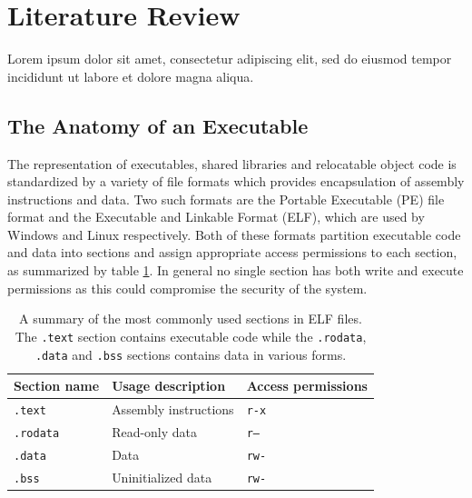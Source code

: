 \documentclass[12pt, a4paper]{article}
\begin{document}
\pagebreak



\section{Literature Review}

Lorem ipsum dolor sit amet, consectetur adipiscing elit, sed do eiusmod tempor incididunt ut labore et dolore magna aliqua.


\subsection{The Anatomy of an Executable}
\label{executable_anatomy}

The representation of executables, shared libraries and relocatable object code is standardized by a variety of file formats which provides encapsulation of assembly instructions and data. Two such formats are the Portable Executable (PE) file format and the Executable and Linkable Format (ELF), which are used by Windows and Linux respectively. Both of these formats partition executable code and data into sections and assign appropriate access permissions to each section, as summarized by table \ref{elf_sections}. In general no single section has both write and execute permissions as this could compromise the security of the system.

\begin{table}[htbp]
	\begin{center}
		\begin{tabular}{|l|l|l|}
			\hline
			Section name & Usage description & Access permissions \\
			\hline
			\texttt{.text} & Assembly instructions & \texttt{r-x} \\
			\texttt{.rodata} & Read-only data & \texttt{r--} \\
			\texttt{.data} & Data & \texttt{rw-} \\
			\texttt{.bss} & Uninitialized data & \texttt{rw-} \\
			\hline
		\end{tabular}
	\end{center}
	\caption{A summary of the most commonly used sections in ELF files. The \texttt{.text} section contains executable code while the \texttt{.rodata}, \texttt{.data} and \texttt{.bss} sections contains data in various forms.}
	\label{elf_sections}
\end{table}
\end{document}
